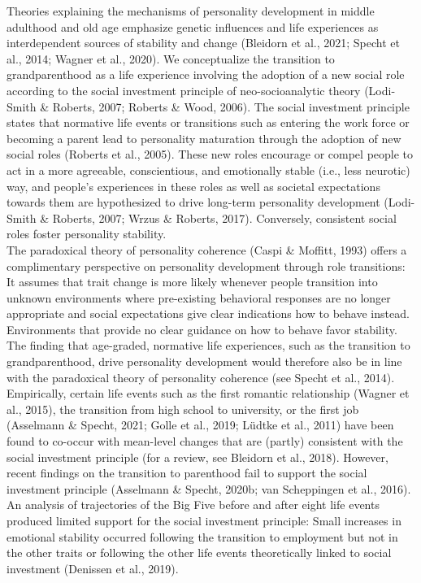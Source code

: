 \documentclass[
  english,
  man,floatsintext]{apa7}
\begin{document}
Theories explaining the mechanisms of personality development in middle adulthood and old age emphasize genetic influences and life experiences as interdependent sources of stability and change (Bleidorn et al., 2021; Specht et al., 2014; Wagner et al., 2020). We conceptualize the transition to grandparenthood as a life experience involving the adoption of a new social role according to the social investment principle of neo-socioanalytic theory (Lodi-Smith \& Roberts, 2007; Roberts \& Wood, 2006). The social investment principle states that normative life events or transitions such as entering the work force or becoming a parent lead to personality maturation through the adoption of new social roles (Roberts et al., 2005). These new roles encourage or compel people to act in a more agreeable, conscientious, and emotionally stable (i.e., less neurotic) way, and people's experiences in these roles as well as societal expectations towards them are hypothesized to drive long-term personality development (Lodi-Smith \& Roberts, 2007; Wrzus \& Roberts, 2017). Conversely, consistent social roles foster personality stability.\\
The paradoxical theory of personality coherence (Caspi \& Moffitt, 1993) offers a complimentary perspective on personality development through role transitions: It assumes that trait change is more likely whenever people transition into unknown environments where pre-existing behavioral responses are no longer appropriate and social expectations give clear indications how to behave instead. Environments that provide no clear guidance on how to behave favor stability. The finding that age-graded, normative life experiences, such as the transition to grandparenthood, drive personality development would therefore also be in line with the paradoxical theory of personality coherence (see Specht et al., 2014).\\
Empirically, certain life events such as the first romantic relationship (Wagner et al., 2015), the transition from high school to university, or the first job (Asselmann \& Specht, 2021; Golle et al., 2019; Lüdtke et al., 2011) have been found to co-occur with mean-level changes that are (partly) consistent with the social investment principle (for a review, see Bleidorn et al., 2018). However, recent findings on the transition to parenthood fail to support the social investment principle (Asselmann \& Specht, 2020b; van Scheppingen et al., 2016). An analysis of trajectories of the Big Five before and after eight life events produced limited support for the social investment principle: Small increases in emotional stability occurred following the transition to employment but not in the other traits or following the other life events theoretically linked to social investment (Denissen et al., 2019).\\
\end{document}
